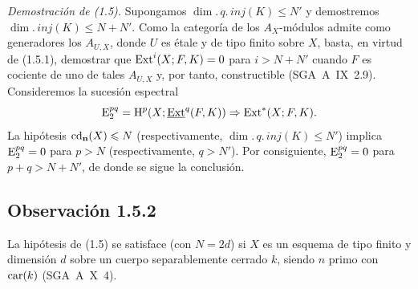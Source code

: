 \emph{Demostración de (1.5).} Supongamos $\dim.\,q.\,inj(K) \leqslant N'$ y demostremos $\dim.\,inj(K) \leqslant N + N'$. Como la categoría de los $A_X$-módulos admite como generadores los $A_{U,X}$, donde $U$ es étale y de tipo finito sobre $X$, basta, en virtud de (1.5.1), demostrar que $\operatorname{Ext}^i(X; F,K) = 0$ para $i > N + N'$ cuando $F$ es cociente de uno de tales $A_{U,X}$ y, por tanto, constructible (SGA~A~IX~2.9). Consideremos la sucesión espectral
\[
\mathrm{E}_2^{pq} = \mathrm{H}^p(X; \underline{\operatorname{Ext}}^q(F,K)) \Rightarrow \operatorname{Ext}^{*}(X; F,K).
\]
La hipótesis $\operatorname{cd}_{\mathbf{n}}(X) \leqslant N$ (respectivamente, $\dim.\,q.\,inj(K) \leqslant N'$) implica $\mathrm{E}_2^{pq} = 0$ para $p > N$ (respectivamente, $q > N'$). Por consiguiente, $\mathrm{E}_2^{pq} = 0$ para $p+q > N+N'$, de donde se sigue la conclusión.

\subsection*{Observación 1.5.2}
La hipótesis de (1.5) se satisface (con $N = 2d$) si $X$ es un esquema de tipo finito y dimensión $d$ sobre un cuerpo separablemente cerrado $k$, siendo $n$ primo con $\operatorname{car}(k)$ (SGA~A~X~4).
